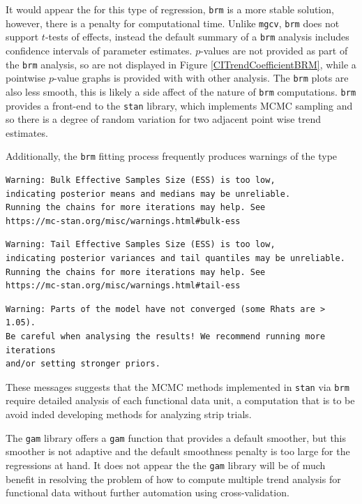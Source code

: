 \documentclass[phdcss]{SDSUThesis}
\begin{document}
It would appear the for this type of regression, \texttt{brm} is a more stable solution, however, there is a penalty for computational time. Unlike \texttt{mgcv}, \texttt{brm} does not support $t$-tests of effects, instead the default summary of a \texttt{brm} analysis includes confidence intervals of parameter estimates. $p$-values are not provided as part of the \texttt{brm} analysis, so are not displayed in Figure \ref{CITrendCoefficientBRM}, while a pointwise $p$-value graphs is provided with with other analysis. The \texttt{brm} plots are also less smooth, this is likely a side affect of the nature of \texttt{brm} computations. \texttt{brm} provides a front-end to the \texttt{stan} library, which implements MCMC sampling and so there is a degree of random variation for two adjacent point wise trend estimates.

Additionally, the \texttt{brm} fitting process frequently produces warnings of the type 

\begin{verbatim}
Warning: Bulk Effective Samples Size (ESS) is too low, 
indicating posterior means and medians may be unreliable.
Running the chains for more iterations may help. See
https://mc-stan.org/misc/warnings.html#bulk-ess
\end{verbatim}

\begin{verbatim}
Warning: Tail Effective Samples Size (ESS) is too low, 
indicating posterior variances and tail quantiles may be unreliable.
Running the chains for more iterations may help. See
https://mc-stan.org/misc/warnings.html#tail-ess
\end{verbatim}

\begin{verbatim}
Warning: Parts of the model have not converged (some Rhats are > 1.05). 
Be careful when analysing the results! We recommend running more iterations
and/or setting stronger priors.
\end{verbatim}

These messages suggests that the MCMC methods implemented in \texttt{stan} via \texttt{brm} require detailed analysis of each functional data unit, a computation that is to be avoid inded developing methods for analyzing strip trials.

The \texttt{gam} library offers a \texttt{gam} function that provides a default smoother, but this smoother is not adaptive and the default smoothness penalty is too large for the regressions at hand. It does not appear the the \texttt{gam} library will be of much benefit in resolving the problem of how to compute multiple trend analysis for functional data without further automation using cross-validation.
\end{document}
